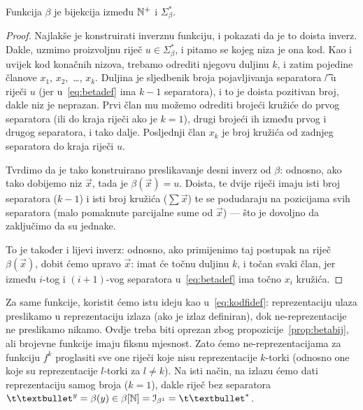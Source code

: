 \begin{propozicija}[{name=[bijektivnost binarne reprezentacije]}]\label{prop:betabij}
Funkcija $\beta$ je bijekcija između ${\mathbb N}^+$ i $\Sigma_\beta^*$.
\end{propozicija}
\begin{proof}
Najlakše je konstruirati inverznu funkciju, i pokazati da je to doista inverz. Dakle, uzmimo proizvoljnu riječ $u\in\Sigma_\beta^*$, i pitamo se kojeg niza je ona kod. Kao i uvijek kod konačnih nizova, trebamo odrediti njegovu duljinu $k$, i zatim pojedine članove $x_1$, $x_2$,~\ldots, $x_k$. Duljina je sljedbenik broja pojavljivanja separatora \t/ u riječi $u$ (jer u~\eqref{eq:betadef} ima $k-1$ separatora), i to je doista pozitivan broj, dakle niz je neprazan. Prvi član mu možemo odrediti brojeći kružiće do prvog separatora (ili do kraja riječi ako je $k=1$), drugi brojeći ih između prvog i drugog separatora, i tako dalje. Posljednji član $x_k$ je broj kružića od zadnjeg separatora do kraja riječi $u$.

Tvrdimo da je tako konstruirano preslikavanje desni inverz od $\beta$: odnosno, ako tako dobijemo niz $\vec x$, tada je $\beta(\vec x)=u$. Doista, te dvije riječi imaju isti broj separatora ($k-1$) i isti broj kružića ($\sum\vec x$) te se podudaraju na pozicijama svih separatora (malo pomaknute parcijalne sume od $\vec x$) --- što je dovoljno da zaključimo da su jednake.

To je također i lijevi inverz: odnosno, ako primijenimo taj postupak na riječ $\beta(\vec x)$, dobit ćemo upravo $\vec x$: imat će točnu duljinu $k$, i točan svaki član, jer između $i$-tog i $(i+1)$-vog separatora u~\eqref{eq:betadef} ima točno $x_i$ kružića.
\end{proof}

Za same funkcije, koristit ćemo istu ideju kao u~\eqref{eq:kodfidef}: reprezentaciju ulaza preslikamo u reprezentaciju izlaza (ako je izlaz definiran), dok ne-reprezentacije ne preslikamo nikamo. Ovdje treba biti oprezan zbog propozicije~\ref{prop:betabij}, ali brojevne funkcije imaju fiksnu mjesnost. Zato ćemo ne-reprezentacijama za funkciju $f^k$ proglasiti sve one riječi koje nisu reprezentacije $k$-torki (odnosno one koje su reprezentacije $l$-torki za $l\ne k$). Na isti način, na izlazu ćemo dati reprezentaciju samog broja ($k=1$), dakle riječ bez separatora $\t\textbullet^y=\beta(y)\in\beta[\N]=\im{\beta^1}=\t\textbullet^*$.

